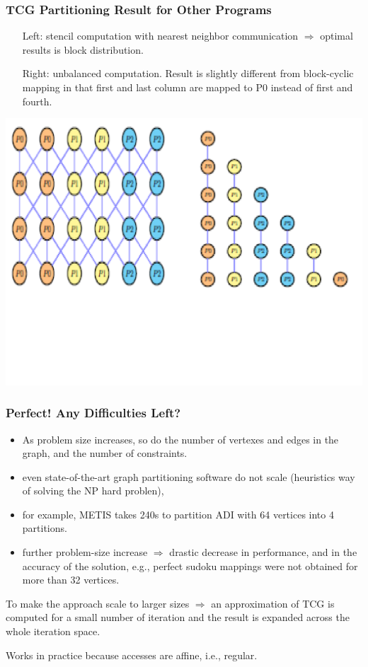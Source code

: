 \documentclass{beamer}
\begin{document}
\begin{frame}[fragile,t]
  \frametitle{TCG Partitioning Result for Other Programs}

\begin{itemize}
    \item[Left:] stencil computation with nearest neighbor
            communication $\Rightarrow$ optimal results 
            is block distribution.
    \item[Right:] unbalanced computation. Result is slightly
            different from block-cyclic mapping in that first
            and last column are mapped to P0 instead of first
            and fourth.
\end  {itemize}


\includegraphics[width=59ex]{ParTeaserFigs/TCGresultStencil}

\end{frame}


\begin{frame}[fragile,t]
  \frametitle{Perfect! Any Difficulties Left?}
\begin{itemize}
    \item As problem size increases, so do the number of
            vertexes and edges in the graph, and the number
            of constraints.
    \item even state-of-the-art graph partitioning software
            do not scale (heuristics way of solving the NP hard problen), 
    \item for example, METIS takes 240s to
            partition ADI with 64 vertices into 4 partitions.
    \item further problem-size increase $\Rightarrow$ \alert{drastic
            decrease in performance, and in the accuracy of the solution},
            e.g., perfect sudoku mappings were not obtained for
            more than 32 vertices.
\end  {itemize}

To make the approach scale to larger sizes $\Rightarrow$ an 
approximation of TCG is computed for a small number of iteration
and the result is expanded across the whole iteration space.\medskip

Works in practice because accesses are affine, i.e., regular.

\end{frame}
\end{document}
